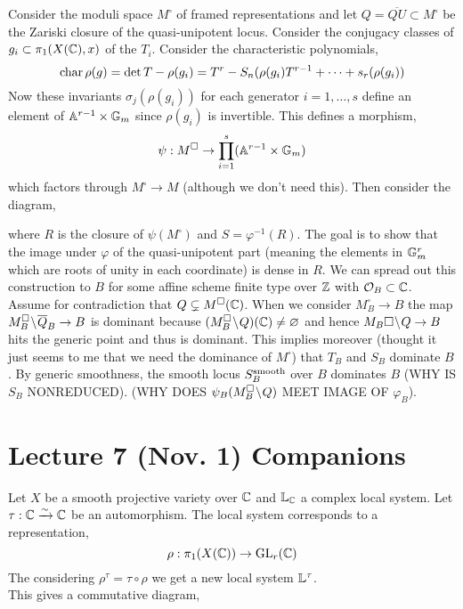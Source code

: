 \documentclass[12pt]{article}
\begin{document}
Consider the moduli space $M^\square$ of framed representations and let $Q = \overline{QU} \subset M^\square$ be the Zariski closure of the quasi-unipotent locus. Consider the conjugacy classes of $g_i \subset \pi_1(X(\mathbb{C}), x)$ of the $T_i$. Consider the characteristic polynomials,
\[ \operatorname{\mathrm{char}}{\rho(g)} = \det{T - \rho(g_i)} = T^r - S_n(\rho(g_i) T^{r-1} + \cdots + s_r(\rho(g_i))  \]
Now these invariants $\sigma_j(\rho(g_i))$ for each generator $i = 1, \dots, s$ define an element of $\mathbb{A}^{r-1} \times \mathbb{G}_m$ since $\rho(g_i)$ is invertible. This defines a morphism,
\[ \psi : M^\square \to \prod_{i = 1}^s (\mathbb{A}^{r-1} \times \mathbb{G}_m) \]
which factors through $M^\square \to M$ (although we don't need this). Then consider the diagram,
\begin{center}
\end{center}
where $R$ is the closure of $\psi(M^{\square})$ and $S = \varphi^{-1}(R)$. The goal is to show that the image under $\varphi$ of the quasi-unipotent part (meaning the elements in $\mathbb{G}_m^r$ which are roots of unity in each coordinate) is dense in $R$. We can spread out this construction to $B$ for some affine scheme finite type over $\mathbb{Z}$ with $\mathcal{O}_{B} \subset \mathbb{C}$. 
\bigskip\\
Assume for contradiction that $Q \subsetneq M^{\square}(\mathbb{C})$. When we consider $M^{\square}_B \to B$ the map $M_B^{\square} \! \setminus \! \overline{Q}_B \to B$ is dominant because $(M_B^\square \! \setminus \! Q)(\mathbb{C}) \neq \varnothing$ and hence $M_B \square \! \setminus \! Q \to B$ hits the generic point and thus is dominant. This implies moreover (thought it just seems to me that we need the dominance of $M^\square$) that $T_B$ and $S_B$ dominate $B$. By generic smoothness, the smooth locus $S_B^{\mathrm{smooth}}$ over $B$ dominates $B$ (WHY IS $S_B$ NONREDUCED). (WHY DOES $\psi_B(M^\square_B \! \setminus \! Q)$ MEET IMAGE OF $\varphi_B$). 

\section{Lecture 7 (Nov. 1) Companions}

Let $X$ be a smooth projective variety over $\mathbb{C}$ and $\mathbb{L}_{\mathbb{C}}$ a complex local system. Let $\tau : \mathbb{C} \xrightarrow{\sim} \mathbb{C}$ be an automorphism. The local system corresponds to a representation,
\[ \rho : \pi_1(X(\mathbb{C})) \to \mathrm{GL}_r(\mathbb{C}) \]
The considering $\rho^{\tau} = \tau \circ \rho$ we get a new local system $\mathbb{L}^\tau$. 
\bigskip\\
This gives a commutative diagram,
\begin{center}
\end{center}
\end{document}
